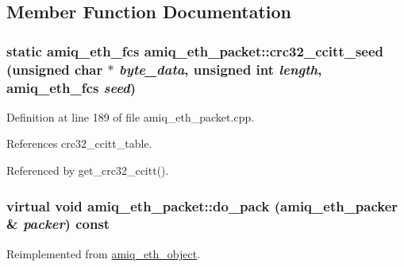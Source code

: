 \subsection{Member Function Documentation}
\hypertarget{classamiq__eth__packet_ac090905485be6152d3904c08ef576d3d}{
\subsubsection[{crc32\_\-ccitt\_\-seed}]{\setlength{\rightskip}{0pt plus 5cm}static {\bf amiq\_\-eth\_\-fcs} amiq\_\-eth\_\-packet::crc32\_\-ccitt\_\-seed (unsigned char $\ast$ {\em byte\_\-data}, \/  unsigned int {\em length}, \/  {\bf amiq\_\-eth\_\-fcs} {\em seed})}}
\label{classamiq__eth__packet_ac090905485be6152d3904c08ef576d3d}


Definition at line 189 of file amiq\_\-eth\_\-packet.cpp.

References crc32\_\-ccitt\_\-table.

Referenced by get\_\-crc32\_\-ccitt().\hypertarget{classamiq__eth__packet_ab580d89fb44208f5a0fe31443619473e}{
\subsubsection[{do\_\-pack}]{\setlength{\rightskip}{0pt plus 5cm}virtual void amiq\_\-eth\_\-packet::do\_\-pack ({\bf amiq\_\-eth\_\-packer} \& {\em packer}) const}}
\label{classamiq__eth__packet_ab580d89fb44208f5a0fe31443619473e}


Reimplemented from \hyperlink{classamiq__eth__object_a1c8e3c7f04c5a75ccfdb5140f1559879}{amiq\_\-eth\_\-object}.

